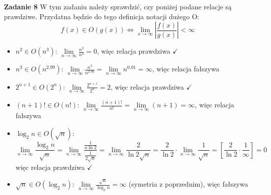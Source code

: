\documentclass[a4paper,12pt]{article}
\begin{document}
\newpage
\noindent \textbf{Zadanie 8} \newline
W tym zadaniu należy sprawdzić, czy poniżej podane relacje są prawdziwe. Przydatna będzie do tego definicja notacji dużego O:
$$ f(x) \in O\left(g(x)\right) \Longleftrightarrow \lim_{x\to\infty} \left| \frac{f(x)}{g(x)} \right| < \infty$$
\begin{itemize}
\item $n^2 \in O(n^3)$: $\lim\limits_{n\to\infty} \frac{n^2}{n^3} = 0$, więc relacja prawdziwa $\checkmark$
\item $n^3 \in O(n^{2.99})$: $\lim\limits_{n\to\infty} \frac{n^3}{n^{2.99}} = \lim\limits_{n\to\infty} n^{0.01} = \infty$, więc relacja fałszywa
\item $2^{n+1} \in O(2^n)$: $\lim\limits_{n\to\infty} \frac{2^{n+1}}{2^n} = 2$, więc relacja prawdziwa $\checkmark$
\item $(n+1)! \in O(n!)$: $\lim\limits_{n\to\infty} \frac{(n+1)!}{n!} = \lim\limits_{n\to\infty} (n+1) = \infty$, więc relacja fałszywa
\item $\log_{2}n \in O(\sqrt{n})$: 
$$\lim\limits_{n\to\infty} \frac{\log_{2}n}{\sqrt{n}} = \lim\limits_{n\to\infty} \frac{\frac{1}{n\ln2}}{\frac{1}{2\sqrt{n}}} = \lim\limits_{n\to\infty} \frac{2}{\ln2 \sqrt{n}} = \frac{2}{\ln2} \cdot \lim\limits_{n\to\infty} \frac{1}{\sqrt{n}} = \left[ \frac{2}{\ln2} \cdot \frac{1}{\infty} \right] = 0$$
więc relacja prawdziwa $\checkmark$
\item $\sqrt{n} \in O(\log_{2}n)$: $\lim\limits_{n\to\infty} \frac{\sqrt{n}}{\log_{2}n} = \infty$ (symetria z poprzednim), więc fałszywa
\end{itemize}
\end{document}
